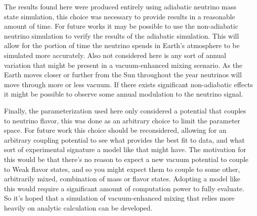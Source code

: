 The results found here were produced entirely using adiabatic neutrino mass state simulation,
this choice was necessary to provide results in a reasonable amount of time.
For future works it may be possible to use the non-adiabatic neutrino simulation to
verify the results of the adiabatic simulation.
This will allow for the portion of time the neutrino spends in Earth's
atmosphere to be simulated more accurately.
Also not considered here is any sort of annual variation that might be
present in a vacuum-enhanced mixing scenario.
As the Earth moves closer or further from the Sun throughout the year neutrinos
will move through more or less vacuum.
If there exists significant non-adiabatic effects it might be possible to observe
some annual modulation to the neutrino signal.

Finally, the parameterization used here only considered a potential that couples to neutrino flavor,
this was done as an arbitrary choice to limit the parameter space.
For future work this choice should be reconsidered, allowing for an arbitrary coupling
potential to see what provides the best fit to data, and what sort of experimental
signature a model like that might have.
The motivation for this would be that there's no reason to expect a new vacuum
potential to couple to Weak flavor states, and so you might expect them to couple
to some other, arbitrarily mixed, combination of mass or flavor states.
Adopting a model like this would require a significant amount of computation power
to fully evaluate.
So it's hoped that a simulation of vacuum-enhanced mixing that relies more heavily
on analytic calculation can be developed.
